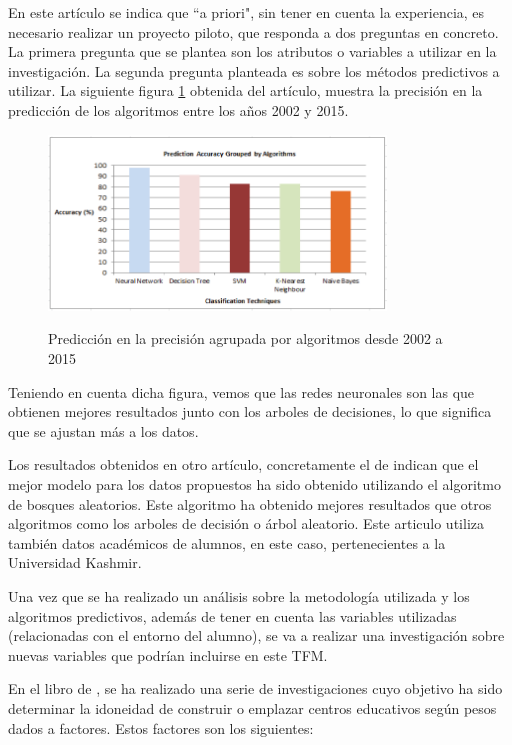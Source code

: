 En este artículo se indica que ``a priori", sin tener en cuenta la experiencia, es necesario realizar un proyecto piloto, que responda a dos preguntas en concreto. La primera pregunta que se plantea son los atributos o variables a utilizar en la investigación. La segunda pregunta planteada es sobre los métodos predictivos a utilizar. La siguiente figura \ref{fig:precMet} obtenida del artículo, muestra la precisión en la predicción de los algoritmos entre los años 2002 y 2015.

\begin{figure}[htb]
	\centering
	\caption{Predicción en la precisión agrupada por algoritmos desde 2002 a 2015}
	\includegraphics[width=0.8\textwidth]{recursos/PrecisionMetodos}
	\label{fig:precMet}
\end{figure}

Teniendo en cuenta dicha figura, vemos que las redes neuronales son las que obtienen mejores resultados junto con los arboles de decisiones, lo que significa que se ajustan más a los datos. 

Los resultados obtenidos en otro artículo, concretamente el de  indican que el mejor modelo para los datos propuestos ha sido obtenido utilizando el algoritmo de bosques aleatorios. Este algoritmo ha obtenido mejores resultados que otros algoritmos como los arboles de decisión o árbol aleatorio. Este articulo utiliza también datos académicos de alumnos, en este caso, pertenecientes a la Universidad Kashmir.

Una vez que se ha realizado un análisis sobre la metodología utilizada y los algoritmos predictivos, además de tener en cuenta las variables utilizadas (relacionadas con el entorno del alumno), se va a realizar una investigación sobre nuevas variables que podrían incluirse en este TFM.

En el libro de , se ha realizado una serie de investigaciones cuyo objetivo ha sido determinar la idoneidad de construir o emplazar centros educativos según pesos dados a factores. Estos factores son los siguientes:

